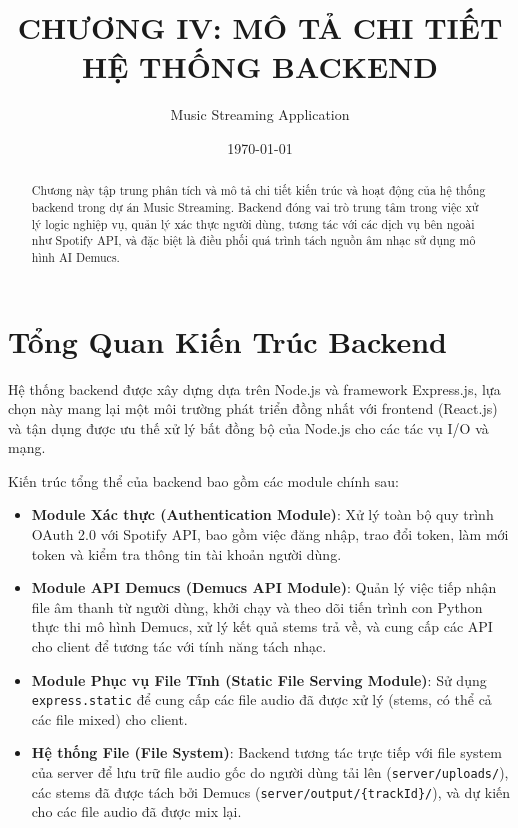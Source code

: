 \documentclass[12pt,a4paper]{article}
\title{\textbf{CHƯƠNG IV: MÔ TẢ CHI TIẾT HỆ THỐNG BACKEND}}
\author{Music Streaming Application}
\date{\today}
\begin{document}
\maketitle

\begin{abstract}
Chương này tập trung phân tích và mô tả chi tiết kiến trúc và hoạt động của hệ thống backend trong dự án Music Streaming. Backend đóng vai trò trung tâm trong việc xử lý logic nghiệp vụ, quản lý xác thực người dùng, tương tác với các dịch vụ bên ngoài như Spotify API, và đặc biệt là điều phối quá trình tách nguồn âm nhạc sử dụng mô hình AI Demucs.
\end{abstract}

\tableofcontents
\newpage

\section{Tổng Quan Kiến Trúc Backend}
\label{sec:backend-overview}

Hệ thống backend được xây dựng dựa trên Node.js và framework Express.js, lựa chọn này mang lại một môi trường phát triển đồng nhất với frontend (React.js) và tận dụng được ưu thế xử lý bất đồng bộ của Node.js cho các tác vụ I/O và mạng.

Kiến trúc tổng thể của backend bao gồm các module chính sau:

\begin{itemize}
    \item \textbf{Module Xác thực (Authentication Module)}: Xử lý toàn bộ quy trình OAuth 2.0 với Spotify API, bao gồm việc đăng nhập, trao đổi token, làm mới token và kiểm tra thông tin tài khoản người dùng.
    \item \textbf{Module API Demucs (Demucs API Module)}: Quản lý việc tiếp nhận file âm thanh từ người dùng, khởi chạy và theo dõi tiến trình con Python thực thi mô hình Demucs, xử lý kết quả stems trả về, và cung cấp các API cho client để tương tác với tính năng tách nhạc.
    \item \textbf{Module Phục vụ File Tĩnh (Static File Serving Module)}: Sử dụng \texttt{express.static} để cung cấp các file audio đã được xử lý (stems, có thể cả các file mixed) cho client.
    \item \textbf{Hệ thống File (File System)}: Backend tương tác trực tiếp với file system của server để lưu trữ file audio gốc do người dùng tải lên (\texttt{server/uploads/}), các stems đã được tách bởi Demucs (\texttt{server/output/\{trackId\}/}), và dự kiến cho các file audio đã được mix lại.
\end{itemize}
\end{document}
